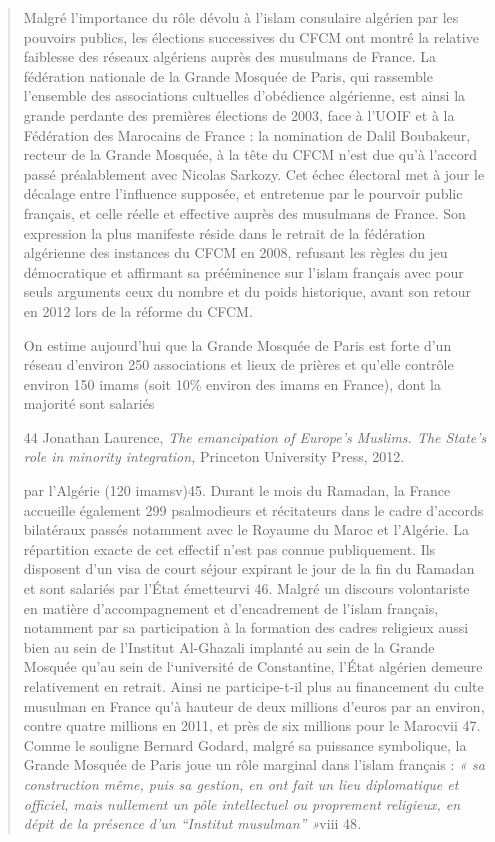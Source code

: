 \begin{quote}
Malgré l'importance du rôle dévolu à l'islam consulaire algérien par les
pouvoirs publics, les élections successives du CFCM ont montré la
relative faiblesse des réseaux algériens auprès des musulmans de France.
La fédération nationale de la Grande Mosquée de Paris, qui rassemble
l'ensemble des associations cultuelles d'obédience algérienne, est ainsi
la grande perdante des premières élections de 2003, face à l'UOIF et à
la Fédération des Marocains de France : la nomination de Dalil
Boubakeur, recteur de la Grande Mosquée, à la tête du CFCM n'est due
qu'à l'accord passé préalablement avec Nicolas Sarkozy. Cet échec
électoral met à jour le décalage entre l'influence supposée, et
entretenue par le pourvoir public français, et celle réelle et effective
auprès des musulmans de France. Son expression la plus manifeste réside
dans le retrait de la fédération algérienne des instances du CFCM en
2008, refusant les règles du jeu démocratique et affirmant sa
prééminence sur l'islam français avec pour seuls arguments ceux du
nombre et du poids historique, avant son retour en 2012 lors de la
réforme du CFCM.

On estime aujourd'hui que la Grande Mosquée de Paris est forte d'un
réseau d'environ 250 associations et lieux de prières et qu'elle
contrôle environ 150 imams (soit 10\% environ des imams en France), dont
la majorité sont salariés

44 Jonathan Laurence, \emph{The emancipation of Europe's Muslims. The
State's role in minority integration,} Princeton University Press, 2012.



par l'Algérie (120 imamsv)45. Durant le mois du Ramadan, la France
accueille également 299 psalmodieurs et récitateurs dans le cadre
d'accords bilatéraux passés notamment avec le Royaume du Maroc et
l'Algérie. La répartition exacte de cet effectif n'est pas connue
publiquement. Ils disposent d'un visa de court séjour expirant le jour
de la fin du Ramadan et sont salariés par l'État émetteurvi 46. Malgré
un discours volontariste en matière d'accompagnement et d'encadrement de
l'islam français, notamment par sa participation à la formation des
cadres religieux aussi bien au sein de l'Institut Al-Ghazali implanté au
sein de la Grande Mosquée qu'au sein de l`université de Constantine,
l'État algérien demeure relativement en retrait. Ainsi ne participe-t-il
plus au financement du culte musulman en France qu'à hauteur de deux
millions d'euros par an environ, contre quatre millions en 2011, et près
de six millions pour le Marocvii 47. Comme le souligne Bernard Godard,
malgré sa puissance symbolique, la Grande Mosquée de Paris joue un rôle
marginal dans l'islam français : \emph{« sa construction même, puis sa
gestion, en ont fait un lieu diplomatique et officiel, mais nullement un
pôle intellectuel ou proprement religieux, en dépit de la présence d'un
``Institut musulman'' »}viii 48\emph{.}
\end{quote}

